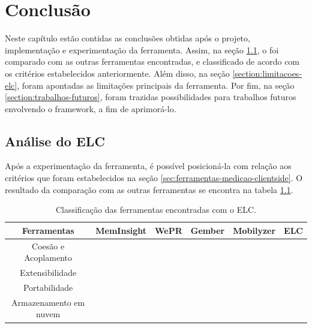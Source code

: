 \documentclass[12pt]{tcc}
\newcommand{\cmark}{\ding{51}}
\newcommand{\xmark}{\ding{55}}
\begin{document}
\chapter{Conclusão}
	\label{cap:conclusão}

	Neste capítulo estão contidas as conclusões obtidas após o projeto, implementação e experimentação da ferramenta. Assim, na seção \ref{section:analise-do-elc}, o  foi comparado com as outras ferramentas encontradas, e classificado de acordo com os critérios estabelecidos anteriormente. Além disso, na seção \ref{section:limitacoes-elc}, foram apontadas as limitações principais da ferramenta. Por fim, na seção \ref{section:trabalhos-futuros}, foram trazidas possibilidades para trabalhos futuros envolvendo o framework, a fim de aprimorá-lo.

	\section{Análise do ELC}
	\label{section:analise-do-elc}

	Após a experimentação da ferramenta, é possível posicioná-la com relação aos critérios que foram estabelecidos na seção \ref{sec:ferramentas-medicao-clientside}. O resultado da comparação com as outras ferramentas se encontra na tabela \ref{table:classificacao-com-elc}.

	\begin{table}[ht]
	\caption{Classificação das ferramentas encontradas com o ELC.} %
	\centering %
	\begin{tabular}{c c c c c c} %
	\toprule %

	\textbf{Ferramentas} &\textbf{MemInsight} & \textbf{WePR} & \textbf{Gember} & \textbf{Mobilyzer} & \textbf{ELC}  \\ [0.4ex]

	\midrule %
	Coesão e Acoplamento & \cmark & \cmark & \cmark & \cmark  & \cmark  \\ 
	Extensibilidade & \xmark & \xmark & \xmark & \xmark  & \cmark \\
	Portabilidade & \cmark & \xmark & \xmark & \xmark  & \cmark \\
	Armazenamento em nuvem & \xmark & \cmark & \cmark & \cmark & \cmark  \\
	\bottomrule %
	\end{tabular}
	\label{table:classificacao-com-elc} %
	\end{table}
\end{document}
